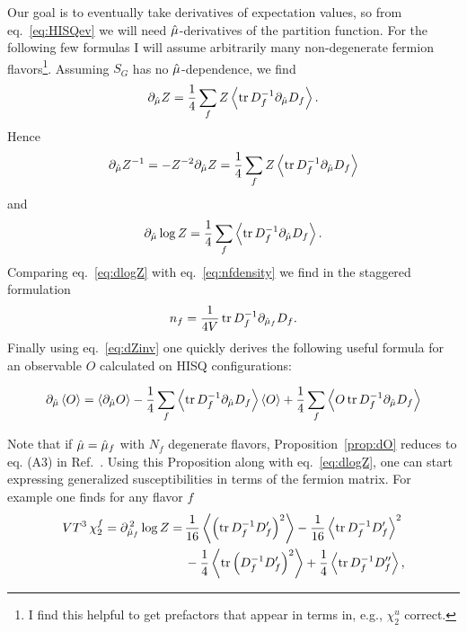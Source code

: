 Our goal is to eventually take derivatives of expectation values, so from
eq.~\eqref{eq:HISQev} we will need $\hat{\mu}$-derivatives of the partition 
function. For the following few formulas 
I will assume arbitrarily many non-degenerate
fermion flavors\footnote{I find this helpful to get prefactors that appear
in terms in, e.g., $\chi_2^u$ correct.}. Assuming $S_G$ has no 
$\hat{\mu}$-dependence, we find
\begin{equation}
  \partial_{\muh}Z = \frac{1}{4}\sum_f 
                      Z\ev{\tr D_f^{-1}\partial_{\muh}D_f}.
\end{equation}
Hence 
\begin{equation}\label{eq:dZinv}
  \partial_{\muh}Z^{-1} = -Z^{-2}\partial_{\muh}Z
                        =\frac{1}{4}\sum_fZ\ev{\tr D_f^{-1}\partial_{\muh}D_f}
\end{equation}
and
\begin{equation}\label{eq:dlogZ}
  \partial_{\muh}\log Z=\frac{1}{4}\sum_f\ev{\tr D_f^{-1}\partial_{\muh}D_f}.
\end{equation}
Comparing eq.~\eqref{eq:dlogZ} with eq.~\eqref{eq:nfdensity} we find in
the staggered formulation
\begin{equation}
  n_f=\frac{1}{4V}\tr D_f^{-1}\partial_{\hat{\mu}_f}D_f.
\end{equation} 
Finally using eq.~\eqref{eq:dZinv} one quickly derives the following useful formula
for an observable $O$ calculated on HISQ configurations:
\begin{proposition}{}{}\label{prop:dO}
\begin{equation*} \partial_{\muh}\ev{O}
       =   \ev{\partial_{\muh}O}
        -\frac{1}{4}\sum_f\ev{\tr D_f^{-1}\partial_{\muh}D_f}\ev{O}
         +\frac{1}{4}\sum_f\ev{O\tr D_f^{-1}\partial_{\muh}D_f}
\end{equation*}
\end{proposition} 
Note that if $\hat{\mu}=\hat{\mu}_f$ with $N_f$ degenerate flavors, 
Proposition~\ref{prop:dO} reduces to eq. (A3)
in Ref.~\cite{allton_thermodynamics_2005}. Using this Proposition along
with eq.~\eqref{eq:dlogZ}, one 
can start expressing generalized susceptibilities in terms of the fermion
matrix. For example one finds for any flavor $f$
\begin{equation}\begin{aligned}
  VT^3\,\chi_2^f =\partial_{\muh_f}^{\,2}\log Z
                 =\, & \frac{1}{16}\ev{\left(\tr D_f^{-1}D_f'\right)^2}
                    -\frac{1}{16}\ev{\tr D_f^{-1}D_f'}^2\\
                   & -\frac{1}{4}\ev{\tr \left(D_f^{-1} D_f'\right)^2}
                    +\frac{1}{4}\ev{\tr D_f^{-1}D_f''},
\end{aligned}\end{equation}
